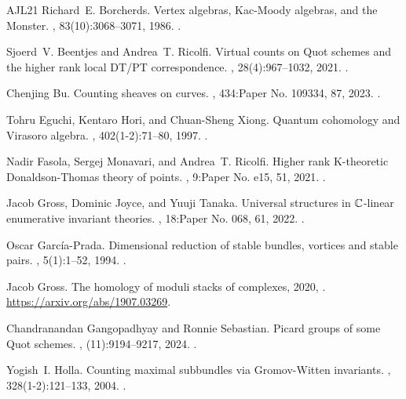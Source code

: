 \documentclass[11pt]{amsart}
\theoremstyle{remark}
\numberwithin{theorem}{section}
\begin{document}
\begin{thebibliography}{AJL{\etalchar{+}}21}
Richard~E. Borcherds.
\newblock Vertex algebras, {K}ac-{M}oody algebras, and the {M}onster.
, 83(10):3068--3071, 1986.
\newblock {}.

Sjoerd~V. Beentjes and Andrea~T. Ricolfi.
\newblock Virtual counts on {Q}uot schemes and the higher rank local {DT}/{PT}
  correspondence.
, 28(4):967--1032, 2021.
\newblock {}.

Chenjing Bu.
\newblock Counting sheaves on curves.
, 434:Paper No. 109334, 87, 2023.
\newblock {}.

Tohru Eguchi, Kentaro Hori, and Chuan-Sheng Xiong.
\newblock Quantum cohomology and {V}irasoro algebra.
, 402(1-2):71--80, 1997.
\newblock {}.

Nadir Fasola, Sergej Monavari, and Andrea~T. Ricolfi.
\newblock Higher rank {K}-theoretic {D}onaldson-{T}homas theory of points.
, 9:Paper No. e15, 51, 2021.
\newblock {}.

Jacob Gross, Dominic Joyce, and Yuuji Tanaka.
\newblock Universal structures in {$\Bbb C$}-linear enumerative invariant
  theories.
, 18:Paper No.
  068, 61, 2022.
\newblock {}.

Oscar Garc\'ia-Prada.
\newblock Dimensional reduction of stable bundles, vortices and stable pairs.
, 5(1):1--52, 1994.
\newblock {}.

Jacob Gross.
\newblock The homology of moduli stacks of complexes, 2020,
  .
\newblock \urlprefix\url{https://arxiv.org/abs/1907.03269}.

Chandranandan Gangopadhyay and Ronnie Sebastian.
\newblock Picard groups of some {Q}uot schemes.
, (11):9194--9217, 2024.
\newblock {}.

Yogish~I. Holla.
\newblock Counting maximal subbundles via {G}romov-{W}itten invariants.
, 328(1-2):121--133, 2004.
\newblock {}.


\end{thebibliography}
\end{document}
